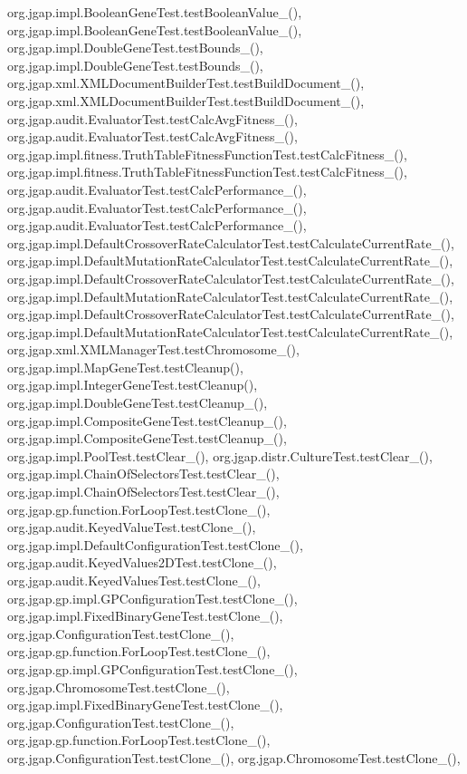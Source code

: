 org.\-jgap.\-impl.\-Boolean\-Gene\-Test.\-test\-Boolean\-Value\-\_(), org.\-jgap.\-impl.\-Boolean\-Gene\-Test.\-test\-Boolean\-Value\-\_(), org.\-jgap.\-impl.\-Double\-Gene\-Test.\-test\-Bounds\-\_(), org.\-jgap.\-impl.\-Double\-Gene\-Test.\-test\-Bounds\-\_(), org.\-jgap.\-xml.\-X\-M\-L\-Document\-Builder\-Test.\-test\-Build\-Document\-\_(), org.\-jgap.\-xml.\-X\-M\-L\-Document\-Builder\-Test.\-test\-Build\-Document\-\_(), org.\-jgap.\-audit.\-Evaluator\-Test.\-test\-Calc\-Avg\-Fitness\-\_(), org.\-jgap.\-audit.\-Evaluator\-Test.\-test\-Calc\-Avg\-Fitness\-\_(), org.\-jgap.\-impl.\-fitness.\-Truth\-Table\-Fitness\-Function\-Test.\-test\-Calc\-Fitness\-\_(), org.\-jgap.\-impl.\-fitness.\-Truth\-Table\-Fitness\-Function\-Test.\-test\-Calc\-Fitness\-\_(), org.\-jgap.\-audit.\-Evaluator\-Test.\-test\-Calc\-Performance\-\_(), org.\-jgap.\-audit.\-Evaluator\-Test.\-test\-Calc\-Performance\-\_(), org.\-jgap.\-audit.\-Evaluator\-Test.\-test\-Calc\-Performance\-\_(), org.\-jgap.\-impl.\-Default\-Crossover\-Rate\-Calculator\-Test.\-test\-Calculate\-Current\-Rate\-\_(), org.\-jgap.\-impl.\-Default\-Mutation\-Rate\-Calculator\-Test.\-test\-Calculate\-Current\-Rate\-\_(), org.\-jgap.\-impl.\-Default\-Crossover\-Rate\-Calculator\-Test.\-test\-Calculate\-Current\-Rate\-\_(), org.\-jgap.\-impl.\-Default\-Mutation\-Rate\-Calculator\-Test.\-test\-Calculate\-Current\-Rate\-\_(), org.\-jgap.\-impl.\-Default\-Crossover\-Rate\-Calculator\-Test.\-test\-Calculate\-Current\-Rate\-\_(), org.\-jgap.\-impl.\-Default\-Mutation\-Rate\-Calculator\-Test.\-test\-Calculate\-Current\-Rate\-\_(), org.\-jgap.\-xml.\-X\-M\-L\-Manager\-Test.\-test\-Chromosome\-\_(), org.\-jgap.\-impl.\-Map\-Gene\-Test.\-test\-Cleanup(), org.\-jgap.\-impl.\-Integer\-Gene\-Test.\-test\-Cleanup(), org.\-jgap.\-impl.\-Double\-Gene\-Test.\-test\-Cleanup\-\_(), org.\-jgap.\-impl.\-Composite\-Gene\-Test.\-test\-Cleanup\-\_(), org.\-jgap.\-impl.\-Composite\-Gene\-Test.\-test\-Cleanup\-\_(), org.\-jgap.\-impl.\-Pool\-Test.\-test\-Clear\-\_(), org.\-jgap.\-distr.\-Culture\-Test.\-test\-Clear\-\_(), org.\-jgap.\-impl.\-Chain\-Of\-Selectors\-Test.\-test\-Clear\-\_(), org.\-jgap.\-impl.\-Chain\-Of\-Selectors\-Test.\-test\-Clear\-\_(), org.\-jgap.\-gp.\-function.\-For\-Loop\-Test.\-test\-Clone\-\_(), org.\-jgap.\-audit.\-Keyed\-Value\-Test.\-test\-Clone\-\_(), org.\-jgap.\-impl.\-Default\-Configuration\-Test.\-test\-Clone\-\_(), org.\-jgap.\-audit.\-Keyed\-Values2\-D\-Test.\-test\-Clone\-\_(), org.\-jgap.\-audit.\-Keyed\-Values\-Test.\-test\-Clone\-\_(), org.\-jgap.\-gp.\-impl.\-G\-P\-Configuration\-Test.\-test\-Clone\-\_(), org.\-jgap.\-impl.\-Fixed\-Binary\-Gene\-Test.\-test\-Clone\-\_(), org.\-jgap.\-Configuration\-Test.\-test\-Clone\-\_(), org.\-jgap.\-gp.\-function.\-For\-Loop\-Test.\-test\-Clone\-\_(), org.\-jgap.\-gp.\-impl.\-G\-P\-Configuration\-Test.\-test\-Clone\-\_(), org.\-jgap.\-Chromosome\-Test.\-test\-Clone\-\_(), org.\-jgap.\-impl.\-Fixed\-Binary\-Gene\-Test.\-test\-Clone\-\_(), org.\-jgap.\-Configuration\-Test.\-test\-Clone\-\_(), org.\-jgap.\-gp.\-function.\-For\-Loop\-Test.\-test\-Clone\-\_(), org.\-jgap.\-Configuration\-Test.\-test\-Clone\-\_(), org.\-jgap.\-Chromosome\-Test.\-test\-Clone\-\_(), 